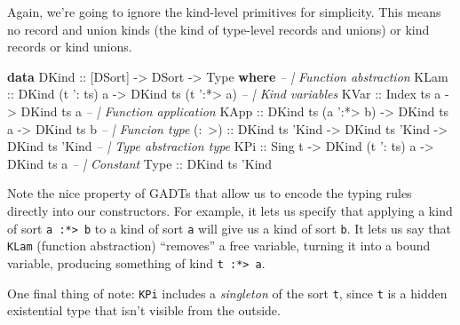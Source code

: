 \documentclass[]{article}
\newenvironment{Shaded}{}{}
\newcommand{\CommentTok}[1]{\textcolor[rgb]{0.38,0.63,0.69}{\textit{#1}}}
\newcommand{\DataTypeTok}[1]{\textcolor[rgb]{0.56,0.13,0.00}{#1}}
\newcommand{\FunctionTok}[1]{\textcolor[rgb]{0.02,0.16,0.49}{#1}}
\newcommand{\KeywordTok}[1]{\textcolor[rgb]{0.00,0.44,0.13}{\textbf{#1}}}
\newcommand{\NormalTok}[1]{#1}
\newcommand{\OtherTok}[1]{\textcolor[rgb]{0.00,0.44,0.13}{#1}}
\begin{document}
Again, we're going to ignore the kind-level primitives for simplicity. This
means no record and union kinds (the kind of type-level records and unions) or
kind records or kind unions.

\begin{Shaded}
\begin{Highlighting}[]
\KeywordTok{data} \DataTypeTok{DKind}\OtherTok{ ::}\NormalTok{ [}\DataTypeTok{DSort}\NormalTok{] }\OtherTok{->} \DataTypeTok{DSort} \OtherTok{->} \DataTypeTok{Type} \KeywordTok{where}
    \CommentTok{-- | Function abstraction}
    \DataTypeTok{KLam}\OtherTok{  ::} \DataTypeTok{DKind}\NormalTok{ (t '}\FunctionTok{:}\NormalTok{ ts) a }\OtherTok{->} \DataTypeTok{DKind}\NormalTok{ ts (t '}\FunctionTok{:*>}\NormalTok{ a)}
    \CommentTok{-- | Kind variables}
    \DataTypeTok{KVar}\OtherTok{  ::} \DataTypeTok{Index}\NormalTok{ ts a }\OtherTok{->} \DataTypeTok{DKind}\NormalTok{ ts a}
    \CommentTok{-- | Function application}
    \DataTypeTok{KApp}\OtherTok{  ::} \DataTypeTok{DKind}\NormalTok{ ts (a '}\FunctionTok{:*>}\NormalTok{ b) }\OtherTok{->} \DataTypeTok{DKind}\NormalTok{ ts a }\OtherTok{->} \DataTypeTok{DKind}\NormalTok{ ts b}
    \CommentTok{-- | Funcion type}
\OtherTok{    (:~>) ::} \DataTypeTok{DKind}\NormalTok{ ts }\DataTypeTok{'Kind} \OtherTok{->} \DataTypeTok{DKind}\NormalTok{ ts }\DataTypeTok{'Kind} \OtherTok{->} \DataTypeTok{DKind}\NormalTok{ ts }\DataTypeTok{'Kind}
    \CommentTok{-- | Type abstraction type}
    \DataTypeTok{KPi}\OtherTok{   ::} \DataTypeTok{Sing}\NormalTok{ t }\OtherTok{->} \DataTypeTok{DKind}\NormalTok{ (t '}\FunctionTok{:}\NormalTok{ ts) a }\OtherTok{->} \DataTypeTok{DKind}\NormalTok{ ts a}
    \CommentTok{-- | Constant}
    \DataTypeTok{Type}\OtherTok{  ::} \DataTypeTok{DKind}\NormalTok{ ts }\DataTypeTok{'Kind}
\end{Highlighting}
\end{Shaded}

Note the nice property of GADTs that allow us to encode the typing rules
directly into our constructors. For example, it lets us specify that applying a
kind of sort \texttt{a\ :*\textgreater{}\ b} to a kind of sort \texttt{a} will
give us a kind of sort \texttt{b}. It lets us say that \texttt{KLam} (function
abstraction) ``removes'' a free variable, turning it into a bound variable,
producing something of kind \texttt{t\ :*\textgreater{}\ a}.

One final thing of note: \texttt{KPi} includes a \emph{singleton} of the sort
\texttt{t}, since \texttt{t} is a hidden existential type that isn't visible
from the outside.
\end{document}
